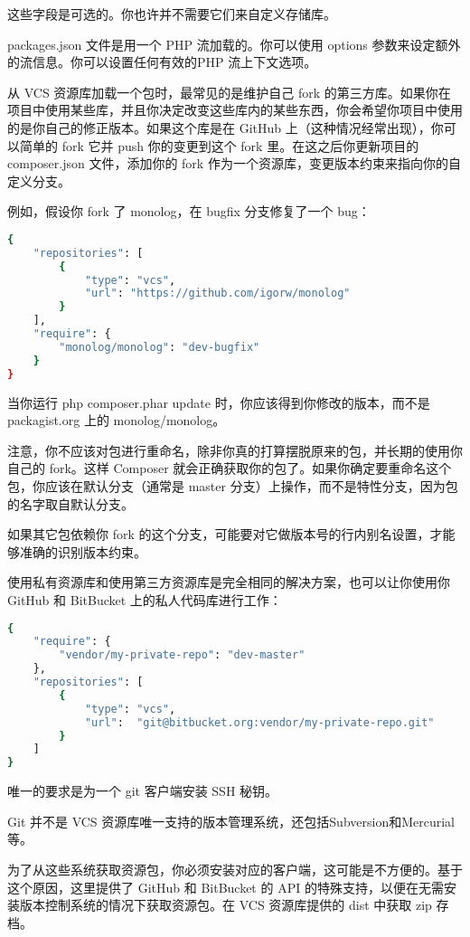 这些字段是可选的。你也许并不需要它们来自定义存储库。


packages.json 文件是用一个 PHP 流加载的。你可以使用 options 参数来设定额外的流信息。你可以设置任何有效的PHP 流上下文选项。

从 VCS 资源库加载一个包时，最常见的是维护自己 fork 的第三方库。如果你在项目中使用某些库，并且你决定改变这些库内的某些东西，你会希望你项目中使用的是你自己的修正版本。如果这个库是在 GitHub 上（这种情况经常出现），你可以简单的 fork 它并 push 你的变更到这个 fork 里。在这之后你更新项目的 composer.json 文件，添加你的 fork 作为一个资源库，变更版本约束来指向你的自定义分支。


例如，假设你 fork 了 monolog，在 bugfix 分支修复了一个 bug：



\begin{lstlisting}[language=bash]
{
    "repositories": [
        {
            "type": "vcs",
            "url": "https://github.com/igorw/monolog"
        }
    ],
    "require": {
        "monolog/monolog": "dev-bugfix"
    }
}
\end{lstlisting}

当你运行 php composer.phar update 时，你应该得到你修改的版本，而不是 packagist.org 上的 monolog/monolog。

注意，你不应该对包进行重命名，除非你真的打算摆脱原来的包，并长期的使用你自己的 fork。这样 Composer 就会正确获取你的包了。如果你确定要重命名这个包，你应该在默认分支（通常是 master 分支）上操作，而不是特性分支，因为包的名字取自默认分支。

如果其它包依赖你 fork 的这个分支，可能要对它做版本号的行内别名设置，才能够准确的识别版本约束。

使用私有资源库和使用第三方资源库是完全相同的解决方案，也可以让你使用你 GitHub 和 BitBucket 上的私人代码库进行工作：



\begin{lstlisting}[language=bash]
{
    "require": {
        "vendor/my-private-repo": "dev-master"
    },
    "repositories": [
        {
            "type": "vcs",
            "url":  "git@bitbucket.org:vendor/my-private-repo.git"
        }
    ]
}
\end{lstlisting}

唯一的要求是为一个 git 客户端安装 SSH 秘钥。

Git 并不是 VCS 资源库唯一支持的版本管理系统，还包括Subversion和Mercurial等。

为了从这些系统获取资源包，你必须安装对应的客户端，这可能是不方便的。基于这个原因，这里提供了 GitHub 和 BitBucket 的 API 的特殊支持，以便在无需安装版本控制系统的情况下获取资源包。在 VCS 资源库提供的 dist 中获取 zip 存档。

